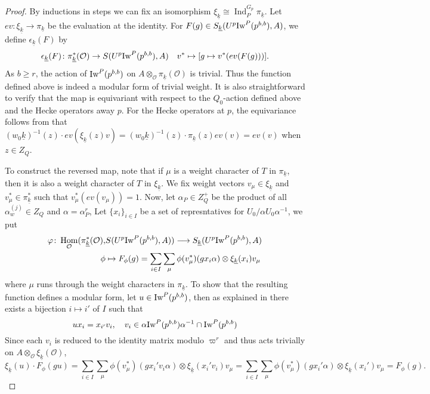 \documentclass[leqno]{amsart}
\theoremstyle{definition}
\theoremstyle{remark}
\newcommand{\oo}{\mathcal{O}}
\DeclareMathOperator{\Hom}{Hom}
\DeclareMathOperator{\Ind}{Ind}
\newcommand{\wt}[1]{\underline{ #1 }}
\newcommand{\Iw}{\textnormal{Iw}} %
\begin{document}
\begin{proof}
	By inductions in steps
	we can fix an isomorphism 
	$\xi_{\wt{k}}\cong \Ind_{P}^{G_p}\pi_{\wt{k}}$.
	Let $ev\colon \xi_{\wt{k}}\to \pi_{\wt{k}}$
	be the evaluation at the identity.
	For $F(g)\in S_{\wt{k}}(U^p\Iw^P(p^{b,b}),A)$,
	we define 
	$\epsilon_{\wt{k}}(F)$ by
	\begin{equation}\label{eq:wt_indep}
	\epsilon_{\wt{k}}(F)\colon 
	\pi^*_{\wt{k}}(\oo)\rightarrow
	S(U^p\Iw^P(p^{b,b}),A)\quad
	v^*\mapsto [g\mapsto v^*(ev(F(g)))].
	\end{equation}
    As $b\geq r$,
	the action of $\Iw^P(p^{b,b})$ on 
	$A\otimes_{\oo}\pi_{\wt{k}}(\oo)$
	is trivial.
	Thus the function defined above is indeed 
	a modular form
	of trivial weight.
	It is also straightforward to verify
	that the map is equivariant with respect
    to the $Q_0$-action defined above
    and the Hecke operators away $p$.
	For the Hecke operators at $p$,
    the equivariance follows from that 
    $(w_0\wt{k})^{-1}(z)\cdot ev(\xi_{\wt{k}}(z)v)=
    (w_0\wt{k})^{-1}(z)\cdot \pi_{\wt{k}}(z)ev(v)=
    ev(v)$ when $z\in Z_Q$.


	To construct the reversed map,
	note that if $\mu$ is a weight character of $T$ in  
	$\pi_{\wt{k}}$, then it is also a weight character 
	of $T$ in $\xi_{\wt{k}}$.
	We fix weight vectors $v_\mu\in \xi_{\wt{k}}$
	and $v^*_\mu\in \pi_{\wt{k}}^*$
	such that $v^*_{\mu}(ev(v_\mu))=1$.
	Now, let $\alpha_P\in Z_Q^+$ be the product
	of all $\alpha_w^{(j)}\in Z_Q$ and $\alpha=\alpha_P^r$,
	Let $\{x_i\}_{i\in I}$
	be a set of represntatives 
	for $U_0/\alpha U_0\alpha^{-1}$,
	we put 
	\begin{align*}
		\varphi\colon 
		\Hom_{\oo}(\pi_{\wt{k}}^*(\oo),&
		S(U^p\Iw^P(p^{b,b}),A))\longrightarrow
		S_{\wt{k}}(U^p\Iw^P(p^{b,b}),A)\\
		\phi&\mapsto 
		F_\phi(g)=\sum_{i\in I} \sum_{\mu}
		\phi(v^*_\mu)(gx_i\alpha)\otimes
		\xi_{\wt{k}}(x_i) v_\mu
	\end{align*}
	where $\mu$ runs through the weight characters in 
	$\pi_{\wt{k}}$.
	To show that the resulting function 
	defines a modular form,
	let $u\in \Iw^P(p^{b,b})$, 
	then as explained in \cite[Prop 2.22]{ger}
	there exists a bijection $i\mapsto i'$ of $I$
	such that 
	 \[
		ux_i=x_{i'}v_i,\quad
		v_i\in\alpha\Iw^P(p^{b,b})\alpha^{-1} 
		\cap \Iw^P(p^{b,b})
	\]
	Since each $v_i$ is reduced to the identity matrix 
	modulo $\varpi^r$ and thus acts trivially on 
	$A\otimes_{\oo}\xi_{\wt{k}}(\oo)$,
	\[
		\xi_{\wt{k}}(u)\cdot F_\phi(gu)=
		\sum_{i\in I}\sum_{\mu}
		\phi(v^*_\mu)(gx_i'v_i\alpha)\otimes
		\xi_{\wt{k}}(x_i'v_i) v_\mu=
		\sum_{i\in I}\sum_{\mu}
		\phi(v^*_\mu)(gx_i'\alpha)\otimes
		\xi_{\wt{k}}(x_i')
        v_\mu=F_\phi(g).
	\]


\end{proof}
\end{document}
